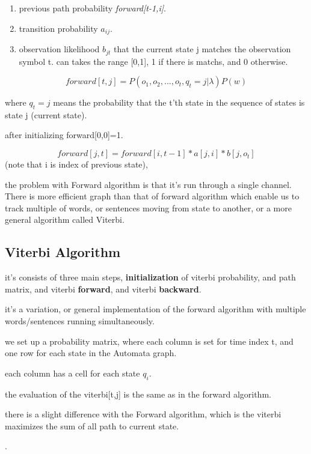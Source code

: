 \documentclass[4apaper,12pt]{book}
\begin{document}
\begin{description}
\begin{enumerate}
\item previous path probability \textit{forward[t-1,i]}.
\item transition probability $a_{ij}$.
\item observation likelihood $b_{jt}$ that the current state j matches the observation symbol t. can takes the range [0,1], 1 if there is matchs, and 0 otherwise.
\end{enumerate}
\item $$ forward[t,j] = P(o_1,o_2,...,o_t,q_t = j|\lambda)P(w) $$
\item where $q_t = j$ means the probability that the t'th state in the sequence of states is state j (current state).
\item after initializing forward[0,0]=1.
\item $$ forward[j,t] = forward[i,t-1] * a[j,i] *b[j,o_t] $$ (note that i is index of previous state),
\item the problem with Forward algorithm is that it's run through a single channel. There is more efficient graph than that of forward algorithm which enable us to track multiple of words, or sentences moving from state to another, or a more general algorithm called Viterbi.
  \subsection {Viterbi Algorithm}
  \item it's consists of three main steps, \textbf{initialization} of viterbi probability, and path matrix, and viterbi \textbf{forward}, and viterbi \textbf{backward}.
\item it's a variation, or general implementation of the forward algorithm with multiple words/sentences running simultaneously.
\item we set up a probability matrix, where each column is set for time index t, and one row for each state in the Automata graph.
\item each column has a cell for each state $q_i$.
\item the evaluation of the viterbi[t,j] is the same as in the forward algorithm.
\item there is a slight difference with the Forward algorithm, which is the viterbi maximizes the sum of all path to current state.
  \item.


\end{description}
\end{document}
